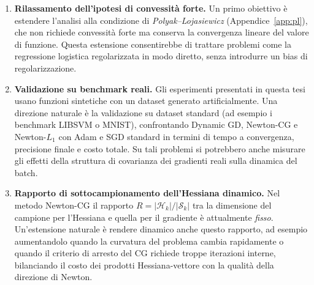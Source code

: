 \begin{enumerate}
  \item \textbf{Rilassamento dell'ipotesi di convessità forte.} Un primo
  obiettivo è estendere l'analisi alla condizione di \emph{Polyak--Lojasiewicz}
  (Appendice~\ref{app:pl}), che non richiede convessità forte ma conserva la
  convergenza lineare del valore di funzione. Questa estensione consentirebbe
  di trattare problemi come la regressione logistica regolarizzata in modo
  diretto, senza introdurre un bias di regolarizzazione.
  \item \textbf{Validazione su benchmark reali.} Gli esperimenti presentati in
  questa tesi usano funzioni sintetiche con un dataset generato artificialmente.
  Una direzione naturale è la validazione su dataset standard (ad esempio i
  benchmark LIBSVM o MNIST), confrontando Dynamic GD, Newton-CG e Newton-$L_1$
  con Adam e SGD standard in termini di tempo a convergenza, precisione finale e
  costo totale. Su tali problemi si potrebbero anche misurare gli effetti della
  struttura di covarianza dei gradienti reali sulla dinamica del batch.
  \item \textbf{Rapporto di sottocampionamento dell'Hessiana dinamico.} Nel
  metodo Newton-CG il rapporto $R = |\mathcal{H}_k|/|\mathcal{S}_k|$ tra la
  dimensione del campione per l'Hessiana e quella per il gradiente è
  attualmente \emph{fisso}. Un'estensione naturale è rendere dinamico anche
  questo rapporto, ad esempio aumentandolo quando la curvatura del problema
  cambia rapidamente o quando il criterio di arresto del CG richiede troppe
  iterazioni interne, bilanciando il costo dei prodotti Hessiana-vettore con la
  qualità della direzione di Newton.
\end{enumerate}
